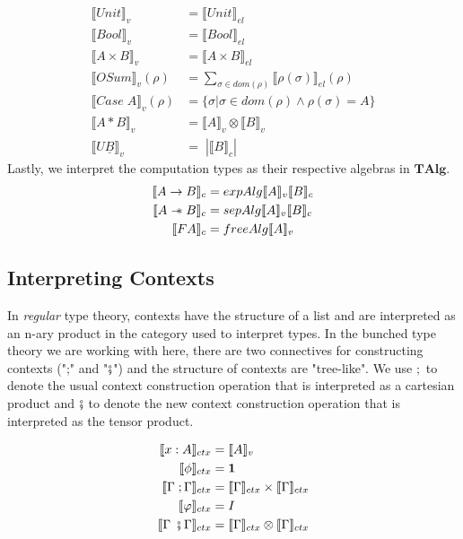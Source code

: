 \documentclass{article}
\newcommand{\sep}{\mathrel{-\mkern-6mu*}}
\begin{document}
\begin{align*}
    \llbracket Unit \rrbracket_v &= \llbracket Unit \rrbracket_{el}\\
    \llbracket Bool \rrbracket_v &= \llbracket Bool \rrbracket_{el}\\
    \llbracket A \times B \rrbracket_v &= \llbracket A \times B \rrbracket_{el}\\
    \llbracket OSum \rrbracket_v (\rho)&= \sum_{\sigma \in dom(\rho)} \llbracket \rho(\sigma) \rrbracket_{el}(\rho)\\
    \llbracket Case \; A \rrbracket_v(\rho) &= \{ \sigma | \sigma \in dom(\rho) \land \rho(\sigma)= A \} \\
    \llbracket A * B \rrbracket_v &= \llbracket A \rrbracket_v \otimes \llbracket B \rrbracket_v \\
    \llbracket U  \underline{B} \rrbracket_v &= \;| \llbracket B \rrbracket_c |
\end{align*}
Lastly, we interpret the computation types as their respective algebras in $\mathbf{TAlg}$. 
\begin{align*}
    \llbracket A \rightarrow B \rrbracket_c &= expAlg\llbracket A \rrbracket_v \llbracket B \rrbracket_c\\
    \llbracket A \sep B \rrbracket_c &= sepAlg\llbracket A \rrbracket_v\llbracket B \rrbracket_c\\
    \llbracket F A \rrbracket_c &= freeAlg\llbracket A \rrbracket_v\\
\end{align*}
\subsection{Interpreting Contexts}
In \textit{regular} type theory, contexts have the structure of a list and are interpreted as an n-ary product in the category used to interpret types. In the bunched type theory we are working with here, there are two connectives for constructing contexts (";" and "$\fatsemi$") and the structure of contexts are "tree-like". We use $;$ to denote the usual context construction operation that is interpreted as a cartesian product and $\fatsemi$ to denote the new context construction operation that is interpreted as the tensor product.

\begin{align*}
    \llbracket x : A \rrbracket_{ctx} &= \llbracket A \rrbracket_v \\
    \llbracket \phi \rrbracket_{ctx} &= \mathbf{1} \\
    \llbracket \Gamma \;; \Gamma \rrbracket_{ctx} &=  \llbracket \Gamma \rrbracket_{ctx} \times \llbracket \Gamma \rrbracket_{ctx}\\
    \llbracket \varphi \rrbracket_{ctx} &= I \\
    \llbracket \Gamma \;\fatsemi \Gamma \rrbracket_{ctx} &=  \llbracket \Gamma \rrbracket_{ctx} \otimes \llbracket \Gamma \rrbracket_{ctx} \\
\end{align*}
\end{document}
